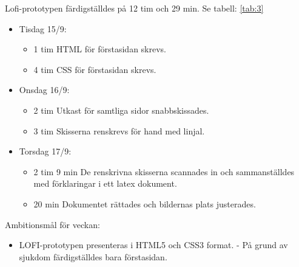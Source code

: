 \documentclass{TDP003mall}
\begin{document}
Lofi-prototypen färdigställdes på 12 tim och 29 min. Se tabell: \ref{tab:3}
\begin{itemize}
  \item Tisdag 15/9:
  \begin{itemize}
    \item 1 tim HTML för förstasidan skrevs.
    \item 4 tim CSS för förstasidan skrevs.
  \end{itemize}
  \item Onsdag 16/9:
  \begin{itemize}
    \item 2 tim Utkast för samtliga sidor snabbskissades.
    \item 3 tim Skisserna renskrevs för hand med linjal.
  \end{itemize}
  \item Torsdag 17/9:
  \begin{itemize}
    \item 2 tim 9 min De renskrivna skisserna scannades in och sammanställdes med förklaringar i ett latex dokument.
    \item 20 min Dokumentet rättades och bildernas plats justerades.
  \end{itemize}
\end{itemize}


Ambitionsmål för veckan:
\begin{itemize}
  \item LOFI-prototypen presenteras i HTML5 och CSS3 format. - På grund av sjukdom färdigställdes bara förstasidan.
  \end{itemize}
  



  
\end{document}
